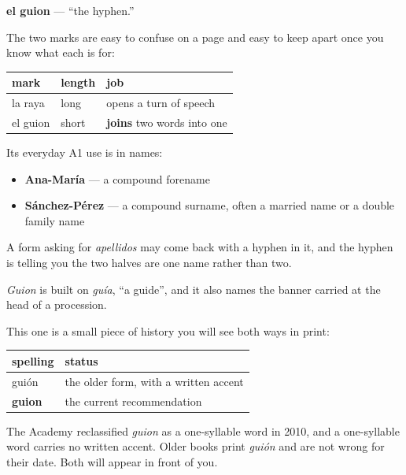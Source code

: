 \begin{cousinweb}
\textbf{el guion} — \textquotedblleft{}the hyphen.\textquotedblright{}

The two marks are easy to confuse on a page and easy to keep apart once you know what each is for:

\noindent
\begin{tabularx}{\linewidth}{@{}>{\raggedright\arraybackslash}X>{\raggedright\arraybackslash}X>{\raggedright\arraybackslash}X@{}}
\toprule
\textbf{mark} & \textbf{length} & \textbf{job} \\
\midrule
la raya & long & opens a turn of speech \\
el guion & short & \textbf{joins} two words into one \\
\bottomrule
\end{tabularx}

Its everyday A1 use is in names:

\begin{itemize}
\raggedright
  \item \textbf{Ana-María} — a compound forename
  \item \textbf{Sánchez-Pérez} — a compound surname, often a married name or a double family name
\end{itemize}

A form asking for \emph{apellidos} may come back with a hyphen in it, and the hyphen is telling you the two halves are one name rather than two.

\emph{Guion} is built on \emph{guía}, \textquotedblleft{}a guide\textquotedblright{}, and it also names the banner carried at the head of a procession.
\end{cousinweb}

\begin{grammarlens}[title={Grammar Lens: the word changed its own spelling}]
This one is a small piece of history you will see both ways in print:

\noindent
\begin{tabularx}{\linewidth}{@{}>{\raggedright\arraybackslash}X>{\raggedright\arraybackslash}X@{}}
\toprule
\textbf{spelling} & \textbf{status} \\
\midrule
guión & the older form, with a written accent \\
\textbf{guion} & the current recommendation \\
\bottomrule
\end{tabularx}

The Academy reclassified \emph{guion} as a one-syllable word in 2010, and a one-syllable word carries no written accent. Older books print \emph{guión} and are not wrong for their date. Both will appear in front of you.
\end{grammarlens}

